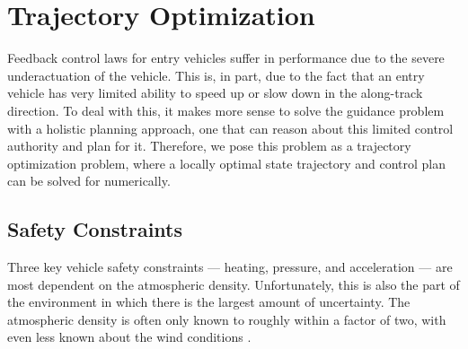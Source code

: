 \section{Trajectory Optimization}
\label{sec:cpeg1:trajopt}
Feedback control laws for entry vehicles suffer in performance due to the severe underactuation of the vehicle. This is, in part, due to the fact that an entry vehicle has very limited ability to speed up or slow down in the along-track direction. To deal with this, it makes more sense to solve the guidance problem with a holistic planning approach, one that can reason about this limited control authority and plan for it. Therefore, we pose this problem as a trajectory optimization problem, where a locally optimal state trajectory and control plan can be solved for numerically.
 \subsection{Safety Constraints}
 Three key vehicle safety constraints --- heating, pressure, and acceleration --- are most dependent on the atmospheric density. Unfortunately, this is also the part of the environment in which there is the largest amount of uncertainty. The atmospheric density is often only known to roughly within a factor of two, with even less known about the wind conditions \cite{gallais2007}.
 
